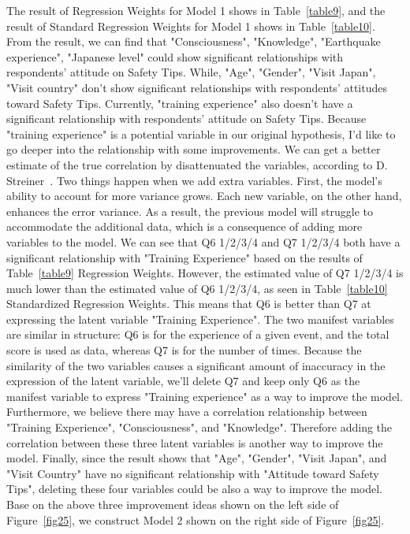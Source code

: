 The result of Regression Weights for Model 1 shows in Table~\ref{table9}, and the result of Standard Regression Weights for Model 1 shows in Table~\ref{table10}. From the result, we can find that "Consciousness", "Knowledge", "Earthquake experience", "Japanese level" could show significant relationships with respondents' attitude on Safety Tips. While, "Age", "Gender", "Visit Japan", "Visit country" don't show significant relationships with respondents' attitudes toward Safety Tips. Currently, "training experience" also doesn't have a significant relationship with respondents' attitude on Safety Tips. Because "training experience" is a potential variable in our original hypothesis, I'd like to go deeper into the relationship with some improvements. We can get a better estimate of the true correlation by disattenuated the variables, according to D. Streiner~\cite{Streiner2006BuildingAB}. Two things happen when we add extra variables. First, the model's ability to account for more variance grows. Each new variable, on the other hand, enhances the error variance. As a result, the previous model will struggle to accommodate the additional data, which is a consequence of adding more variables to the model. We can see that Q6 1/2/3/4 and Q7 1/2/3/4 both have a significant relationship with "Training Experience" based on the results of Table~\ref{table9} Regression Weights. However, the estimated value of Q7 1/2/3/4 is much lower than the estimated value of Q6 1/2/3/4, as seen in Table~\ref{table10} Standardized Regression Weights. This means that Q6 is better than Q7 at expressing the latent variable "Training Experience". The two manifest variables are similar in structure: Q6 is for the experience of a given event, and the total score is used as data, whereas Q7 is for the number of times. Because the similarity of the two variables causes a significant amount of inaccuracy in the expression of the latent variable, we'll delete Q7 and keep only Q6 as the manifest variable to express "Training experience" as a way to improve the model. Furthermore, we believe there may have a correlation relationship between "Training Experience", "Consciousness", and "Knowledge". Therefore adding the correlation between these three latent variables is another way to improve the model. Finally, since the result shows that "Age", "Gender", "Visit Japan", and "Visit Country" have no significant relationship with "Attitude toward Safety Tips", deleting these four variables could be also a way to improve the model. Base on the above three improvement ideas shown on the left side of  Figure~\ref{fig25}, we construct Model 2 shown on the right side of Figure~\ref{fig25}.

